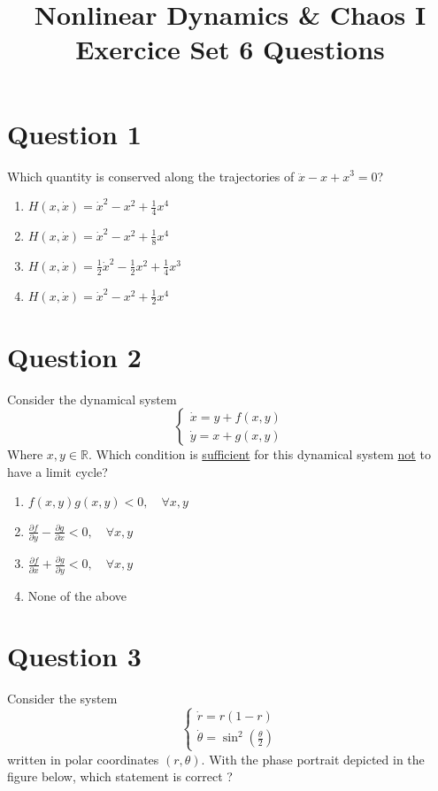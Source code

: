 \documentclass[twoside,10pt,a4paper]{article}
\title{\huge \textbf{Nonlinear Dynamics \& Chaos I \\ \Large Exercice Set 6 Questions}}	%
\author{ }		%
\date{ }	%
\begin{document}
\maketitle

\section*{Question 1}
Which quantity is conserved along the trajectories of $\ddot{x} - x + x^3 = 0$?

\begin{enumerate}[label=(\alph*)]
	\item $ \displaystyle  H(x, \dot{x}) = \dot{x}^2 - x^2 + \frac{1}{4}x^4 $
	\item $ \displaystyle  H(x, \dot{x}) = \dot{x}^2 - x^2 + \frac{1}{8}x^4 $
	\item $ \displaystyle  H(x, \dot{x}) = \frac{1}{2}\dot{x}^2 - \frac{1}{2}x^2 + \frac{1}{4}x^3 $
	\item $ \displaystyle  H(x, \dot{x}) = \dot{x}^2 - x^2 + \frac{1}{2}x^4 $
\end{enumerate}

\section*{Question 2}
Consider the dynamical system
\begin{equation*}
	\begin{cases}
		\dot{x} = y + f(x,y) \\
		\dot{y} = x + g(x,y)
	\end{cases}
\end{equation*}
Where $x,y \in \mathbb{R}$. Which condition is \underline{sufficient} for this dynamical system \underline{not} to have a limit cycle?

\begin{enumerate}[label=(\alph*)]
	\item $ \displaystyle f(x,y)g(x,y) < 0, \quad \forall x,y $
	\item $ \displaystyle \frac{\partial f}{\partial y} - \frac{\partial g}{\partial x} < 0, \quad \forall x,y $
	\item $ \displaystyle \frac{\partial f}{\partial x} + \frac{\partial g}{\partial y} < 0, \quad \forall x,y $
	\item None of the above
\end{enumerate}

\section*{Question 3}
Consider the system
\begin{equation*}
	\begin{cases}
		\dot{r} = r(1 - r) \\
		\dot{\theta} = \sin^2 \left( \frac{\theta}{2} \right)
	\end{cases}
\end{equation*}
written in polar coordinates $(r, \theta)$. With the phase portrait depicted in the figure below, which statement is correct ?
\end{document}
